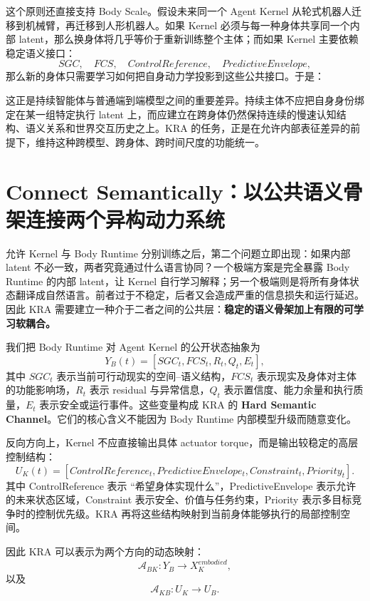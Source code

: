 这个原则还直接支持 Body Scale。假设未来同一个 Agent Kernel 从轮式机器人迁移到机械臂，再迁移到人形机器人。如果 Kernel 必须与每一种身体共享同一个内部 latent，那么换身体将几乎等价于重新训练整个主体；而如果 Kernel 主要依赖稳定语义接口：
\[
SGC,\quad FCS,\quad ControlReference,\quad PredictiveEnvelope,
\]
那么新的身体只需要学习如何把自身动力学投影到这些公共接口。于是：
\begin{statementbox}
\centering
{}
\end{statementbox}

这正是持续智能体与普通端到端模型之间的重要差异。持续主体不应把自身身份绑定在某一组特定执行 latent 上，而应建立在跨身体仍然保持连续的慢速认知结构、语义关系和世界交互历史之上。KRA 的任务，正是在允许内部表征差异的前提下，维持这种跨模型、跨身体、跨时间尺度的功能统一。

\section{Connect Semantically：以公共语义骨架连接两个异构动力系统}

允许 Kernel 与 Body Runtime 分别训练之后，第二个问题立即出现：如果内部 latent 不必一致，两者究竟通过什么语言协同？一个极端方案是完全暴露 Body Runtime 的内部 latent，让 Kernel 自行学习解释；另一个极端则是将所有身体状态翻译成自然语言。前者过于不稳定，后者又会造成严重的信息损失和运行延迟。因此 KRA 需要建立一种介于二者之间的公共层：\textbf{稳定的语义骨架加上有限的可学习软耦合。}

我们把 Body Runtime 对 Agent Kernel 的公开状态抽象为
\[
Y_B(t)
=
\left[
SGC_t,
FCS_t,
R_t,
Q_t,
E_t
\right],
\]
其中 $SGC_t$ 表示当前可行动现实的空间--语义结构，$FCS_t$ 表示现实及身体对主体的功能影响场，$R_t$ 表示 residual 与异常信息，$Q_t$ 表示置信度、能力余量和执行质量，$E_t$ 表示安全或运行事件。这些变量构成 KRA 的 \textbf{Hard Semantic Channel}。它们的核心含义不能因为 Body Runtime 内部模型升级而随意变化。

反向方向上，Kernel 不应直接输出具体 actuator torque，而是输出较稳定的高层控制结构：
\[
U_K(t)
=
\left[
ControlReference_t,
PredictiveEnvelope_t,
Constraint_t,
Priority_t
\right].
\]
其中 ControlReference 表示 ``希望身体实现什么''，PredictiveEnvelope 表示允许的未来状态区域，Constraint 表示安全、价值与任务约束，Priority 表示多目标竞争时的控制优先级。KRA 再将这些结构映射到当前身体能够执行的局部控制空间。

因此 KRA 可以表示为两个方向的动态映射：
\[
\mathcal A_{BK}:
Y_B
\rightarrow
X_K^{embodied},
\]
以及
\[
\mathcal A_{KB}:
U_K
\rightarrow
U_B.
\]

